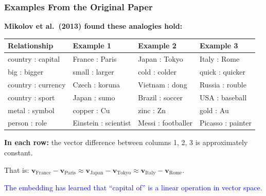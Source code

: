 \documentclass[notes,11pt, aspectratio=169]{beamer}
\newcommand{\vv}{\mathbf{v}}
\begin{document}
\begin{frame}
\frametitle{Examples From the Original Paper}

\textbf{Mikolov et al.\ (2013) found these analogies hold:}

\vspace{4pt}
\begin{center}
\renewcommand{\arraystretch}{1.3}
\small
\begin{tabular}{l l l l}
\toprule
\textbf{Relationship} & \textbf{Example 1} & \textbf{Example 2} & \textbf{Example 3} \\
\midrule
country : capital & France : Paris & Japan : Tokyo & Italy : Rome \\
big : bigger & small : larger & cold : colder & quick : quicker \\
country : currency & Czech : koruna & Vietnam : dong & Russia : rouble \\
country : sport & Japan : sumo & Brazil : soccer & USA : baseball \\
metal : symbol & copper : Cu & zinc : Zn & gold : Au \\
person : role & Einstein : scientist & Messi : footballer & Picasso : painter \\
\bottomrule
\end{tabular}
\end{center}

\vspace{8pt}
\textbf{In each row:} the vector difference between columns 1, 2, 3 is approximately constant.

\vspace{4pt}
That is: $\vv_\text{France} - \vv_\text{Paris} \approx \vv_\text{Japan} - \vv_\text{Tokyo} \approx \vv_\text{Italy} - \vv_\text{Rome}$.

\vspace{4pt}
\textcolor{blue}{The embedding has learned that ``capital of'' is a linear operation in vector space.}

\vspace{8pt}
\end{frame}
\end{document}

